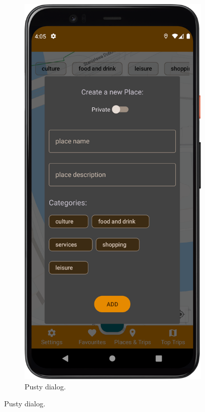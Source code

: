 \begin{figure}[H]
\begin{subfigure}[b]{0.3\textwidth}
                \includegraphics[width=\textwidth]{src/app/add_place1.png}
                \caption{Pusty dialog.\label{place_empty}}

\end{subfigure}
\end{figure}
